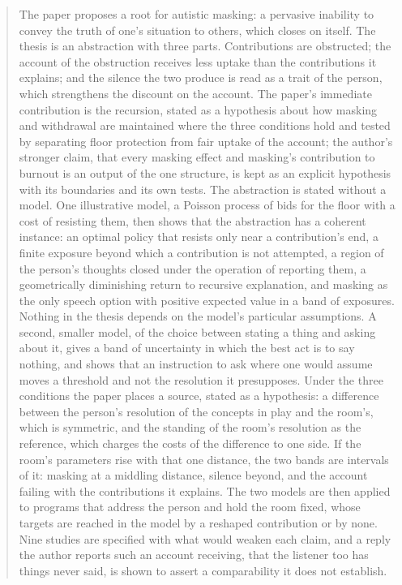 \begin{abstract}
The paper proposes a root for autistic masking: a pervasive inability to convey the truth of one's situation to others, which closes on itself. The thesis is an abstraction with three parts. Contributions are obstructed; the account of the obstruction receives less uptake than the contributions it explains; and the silence the two produce is read as a trait of the person, which strengthens the discount on the account. The paper's immediate contribution is the recursion, stated as a hypothesis about how masking and withdrawal are maintained where the three conditions hold and tested by separating floor protection from fair uptake of the account; the author's stronger claim, that every masking effect and masking's contribution to burnout is an output of the one structure, is kept as an explicit hypothesis with its boundaries and its own tests. The abstraction is stated without a model. One illustrative model, a Poisson process of bids for the floor with a cost of resisting them, then shows that the abstraction has a coherent instance: an optimal policy that resists only near a contribution's end, a finite exposure beyond which a contribution is not attempted, a region of the person's thoughts closed under the operation of reporting them, a geometrically diminishing return to recursive explanation, and masking as the only speech option with positive expected value in a band of exposures. Nothing in the thesis depends on the model's particular assumptions. A second, smaller model, of the choice between stating a thing and asking about it, gives a band of uncertainty in which the best act is to say nothing, and shows that an instruction to ask where one would assume moves a threshold and not the resolution it presupposes. Under the three conditions the paper places a source, stated as a hypothesis: a difference between the person's resolution of the concepts in play and the room's, which is symmetric, and the standing of the room's resolution as the reference, which charges the costs of the difference to one side. If the room's parameters rise with that one distance, the two bands are intervals of it: masking at a middling distance, silence beyond, and the account failing with the contributions it explains. The two models are then applied to programs that address the person and hold the room fixed, whose targets are reached in the model by a reshaped contribution or by none. Nine studies are specified with what would weaken each claim, and a reply the author reports such an account receiving, that the listener too has things never said, is shown to assert a comparability it does not establish.

\end{abstract}
